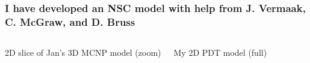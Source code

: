\documentclass[compress,10pt]{beamer}
\begin{document}
\begin{frame}
    \frametitle{I have developed an NSC model with help from J. Vermaak, C. McGraw, and D. Bruss}

    \centering
    \begin{columns}[c]


        \centering
        {\small 2D slice of Jan's 3D MCNP model (zoom)}


        \centering
        {\small My 2D PDT model (full)}

    \end{columns}

    \begin{columns}[t]

        \centering

        \vspace{7mm}

        \centering


    \end{columns}

\end{frame}

\typeout{***********************************************************************************}
\end{document}
